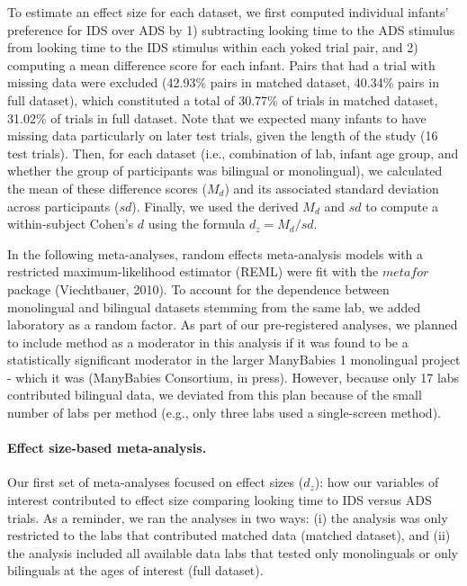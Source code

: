 \documentclass[english,,man,floatsintext]{apa6}
\begin{document}
To estimate an effect size for each dataset, we first computed individual infants' preference for IDS over ADS by 1) subtracting looking time to the ADS stimulus from looking time to the IDS stimulus within each yoked trial pair, and 2) computing a mean difference score for each infant. Pairs that had a trial with missing data were excluded (42.93\% pairs in matched dataset, 40.34\% pairs in full dataset), which constituted a total of 30.77\% of trials in matched dataset, 31.02\% of trials in full dataset. Note that we expected many infants to have missing data particularly on later test trials, given the length of the study (16 test trials). Then, for each dataset (i.e., combination of lab, infant age group, and whether the group of participants was bilingual or monolingual), we calculated the mean of these difference scores (\(M_d\)) and its associated standard deviation across participants (\(sd\)). Finally, we used the derived \(M_d\) and \(sd\) to compute a within-subject Cohen's \(d\) using the formula \(d_z = M_d/sd\).

In the following meta-analyses, random effects meta-analysis models with a restricted maximum-likelihood estimator (REML) were fit with the \(metafor\) package (Viechtbauer, 2010). To account for the dependence between monolingual and bilingual datasets stemming from the same lab, we added laboratory as a random factor. As part of our pre-registered analyses, we planned to include method as a moderator in this analysis if it was found to be a statistically significant moderator in the larger ManyBabies 1 monolingual project - which it was (ManyBabies Consortium, in press). However, because only 17 labs contributed bilingual data, we deviated from this plan because of the small number of labs per method (e.g., only three labs used a single-screen method).

\hypertarget{effect-size-based-meta-analysis.}{%
\paragraph{Effect size-based meta-analysis.}\label{effect-size-based-meta-analysis.}}

Our first set of meta-analyses focused on effect sizes (\(d_z\)): how our variables of interest contributed to effect size comparing looking time to IDS versus ADS trials. As a reminder, we ran the analyses in two ways: (i) the analysis was only restricted to the labs that contributed matched data (matched dataset), and (ii) the analysis included all available data labs that tested only monolinguals or only bilinguals at the ages of interest (full dataset).
\end{document}
